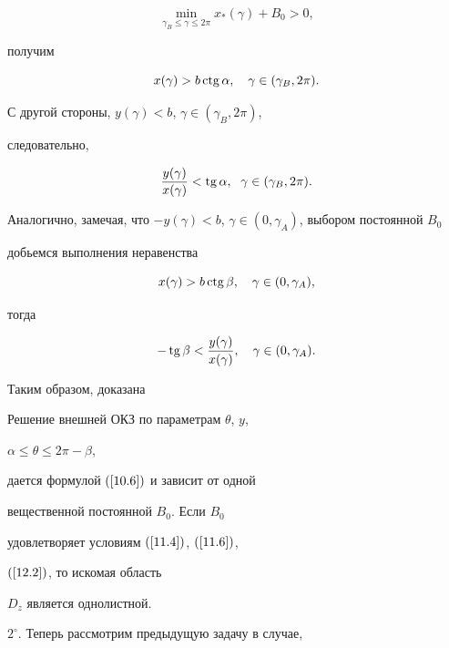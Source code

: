 {$$


\min_{\gamma_{B}\leq\gamma\leq2\pi}x_{*}(\gamma)+B_{0} > 0,


$$


получим


$$


x(\gamma) > b\ctg \alpha,\quad\gamma\in (\gamma_{B},2\pi).


$$


С другой стороны, $y(\gamma) < b$, $\gamma\in (\gamma_{B},2\pi)$,


следовательно,


$$


\frac{y(\gamma)}{x(\gamma)} <\tg\alpha,\ \;\gamma\in (\gamma_{B},2\pi).


$$


Аналогично, замечая, что $-y(\gamma) < b$, $\gamma\in (0,


\gamma_{A})$, выбором постоянной $B_{0}$


добьемся выполнения неравенства


$$


x(\gamma) > b\ctg\beta,\quad\gamma\in (0,\gamma_{A}),


$$


тогда


$$


-\tg\beta <\frac{y(\gamma)}{x(\gamma)},\quad\gamma\in (0,\gamma_{A}).


$$





Таким образом, доказана 





\begin{thm}


Решение внешней ОКЗ по параметрам $\theta$, $y$,


$\alpha\le\theta\le2\pi-\beta$,


дается формулой $(\ref{10.6})$ и зависит от одной 


вещественной постоянной $B_0$. Если $B_0$


удовлетворяет условиям $(\ref{11.4})$, $(\ref{11.6})$,


$(\ref{12.2})$, то искомая область 


$D_z$ является однолистной.


\end{thm}





$2^{\circ}$. Теперь рассмотрим предыдущую задачу в случае,


}
